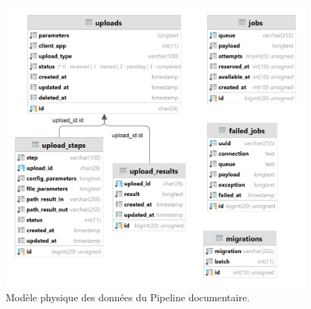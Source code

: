 \begin{figure}
    \centering
    \includegraphics[width=\textwidth]{img/sdf_db}
    \caption{Modèle physique des données du Pipeline documentaire.}
    \label{fig:mpd}
\end{figure}